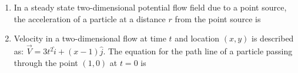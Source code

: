 \documentclass[a4paper,10pt]{article}
\begin{document}
\begin{enumerate}
    \hfill{}
    \begin{enumerate}
    \end{enumerate}

    \item In a steady state two-dimensional potential flow field due to a point source, the acceleration of a particle at a distance $r$ from the point source is
    
    \hfill{}
    \begin{enumerate}
    \end{enumerate}

    \item Velocity in a two-dimensional flow at time $t$ and location $(x, y)$ is described as: $\vec{V} = 3t^2 \hat{i} +(x-1)\hat{j}$. The equation for the path line of a particle passing through the point $(1,0)$ at $t=0$ is
    
    \hfill{}
    \begin{enumerate}
    \end{enumerate}
    

\end{enumerate}
\end{document}

